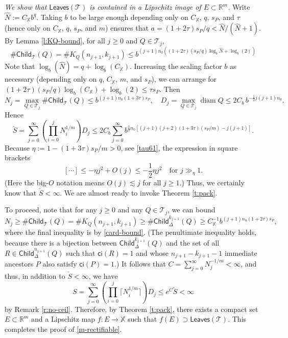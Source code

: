 \documentclass[12pt]{amsart}
\theoremstyle{definition}
\theoremstyle{remark}
\newcommand{\RR}{\mathbb{R}}
\newcommand{\XX}{\mathbb{X}}
\newcommand{\diam}{\mathop\mathrm{diam}\nolimits}
\newcommand{\leaves}{\mathsf{Leaves}}
\newcommand{\Child}{\mathsf{Child}}
\numberwithin{figure}{section}
\numberwithin{equation}{section}
\begin{document}
\emph{We show that $\leaves(\mathcal{T})$ is contained in a Lipschitz image of $E\subset\RR^m$.} Write $\hat N:=C_\XX b^q$. Taking $b$ to be large enough depending only on $C_\XX$, $q$, $s_P$, and $\tau$ (hence only on $C_\XX$, $q$, $s_P$, and $m$) ensures that $a=(1+2\tau)s_P/q<\hat N/(\hat N+1)$. By Lemma \ref{l:KQ-bound}, for all $j\geq 0$ and $Q\in\mathcal{T}_j$, \begin{equation}\#\Child_\mathcal{T}(Q)=\#K_Q(n_{j+1},k_{j+1}) \leq b^{(j+1)n_0\left((1+2\tau)(s_P/q)\log_b\hat N+\log_b(2)\right)}\end{equation} Note that $\log_b(\hat N)=q+\log_b(C_\XX)$. Increasing the scaling factor $b$ as necessary (depending only on $q$, $C_\XX$, $m$, and $s_P$), we can arrange for  $(1+2\tau)(s_P/q)\log_b(C_\XX)+\log_b(2)\leq \tau s_P$. Then \begin{equation} N_j=\max_{Q\in\mathcal{T}_j}\#\Child_\mathcal{T}(Q) \leq b^{(j+1)n_0(1+3\tau)s_P},\quad D_j=\max_{Q\in\mathcal{T}_j}\diam Q\leq 2C_b\,b^{-\frac{1}{2}j(j+1)n_0}.\end{equation} Hence \begin{equation}\label{check-S}
\check S=\sum_{j=0}^\infty \left(\prod_{i=0}^j N_i^{1/m}\right)D_j\leq 2C_b\sum_{j=0}^\infty b^{\frac12 n_0\left[(j+1)(j+2)(1+3\tau)(s_P/m)-j(j+1)\right]}.\end{equation} Because $\eta:=1-(1+3\tau)s_P/m>0$, see \eqref{tau61}, the expression in square brackets $$[\cdots]\leq -\eta j^2+O(j)\leq -\frac{1}{2}\eta j^2\quad\text{for }j\gg_\eta 1.$$ (Here the big-$O$ notation means $O(j)\lesssim j$ for all $j\geq 1$.) Thus, we certainly know that $\check S<\infty$. We are almost ready to invoke Theorem \ref{t:pack}.

To proceed, note that for any $j\geq 0$ and any $Q\in\mathcal{T}_j$, we can bound \begin{equation}N_j\geq \#\Child_\mathcal{T}(Q)=\# K_Q(n_{j+1},k_{j+1})\geq \#\Child_{\Delta}^{k_{j+1}}(Q)\geq C_\XX^{-1}b^{(j+1)n_0(1+2\tau)s_P},\end{equation} where the final inequality is by \eqref{card-bound}. (The penultimate inequality holds, because there is a bijection between $\Child_{\Delta}^{k_{j+1}}(Q)$ and the set of all $R\in\Child_\Delta^{n_{j+1}}(Q)$ such that $\mathsf{ci}(R)=1$ and whose $n_{j+1}-k_{j+1}-1$ immediate ancestors $P$ also satisfy $\mathsf{ci}(P)=1$.) It follows that $C=\sum_{j=0}^\infty N_j^{-1/m} <\infty$, and thus, in addition to $\check S<\infty$, we have \begin{equation}S=\sum_{j=0}^\infty \left(\prod_{i=0}^j \lceil N_i^{1/m}\rceil\right)D_j\leq e^C\check S<\infty \end{equation} by Remark \ref{r:no-ceil}. Therefore, by Theorem \ref{t:pack}, there exists a compact set $E\subset\RR^m$ and a Lipschitz map $f:E\rightarrow\XX$ such that $f(E)\supset \leaves(\mathcal{T})$. This completes the proof of \eqref{m-rectifiable}.
\end{document}
